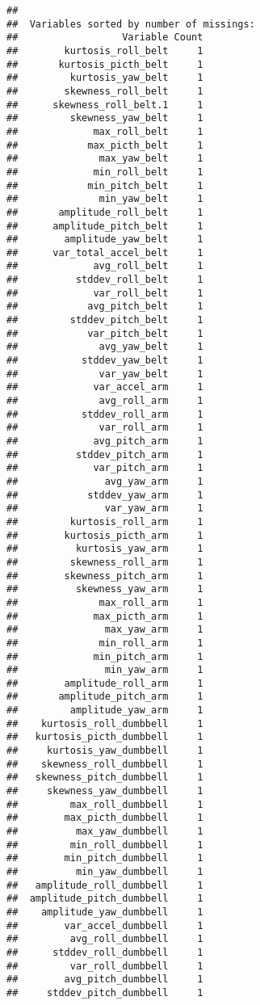 \documentclass[]{article}
\begin{document}
\begin{verbatim}
## 
##  Variables sorted by number of missings: 
##                  Variable Count
##        kurtosis_roll_belt     1
##       kurtosis_picth_belt     1
##         kurtosis_yaw_belt     1
##        skewness_roll_belt     1
##      skewness_roll_belt.1     1
##         skewness_yaw_belt     1
##             max_roll_belt     1
##            max_picth_belt     1
##              max_yaw_belt     1
##             min_roll_belt     1
##            min_pitch_belt     1
##              min_yaw_belt     1
##       amplitude_roll_belt     1
##      amplitude_pitch_belt     1
##        amplitude_yaw_belt     1
##      var_total_accel_belt     1
##             avg_roll_belt     1
##          stddev_roll_belt     1
##             var_roll_belt     1
##            avg_pitch_belt     1
##         stddev_pitch_belt     1
##            var_pitch_belt     1
##              avg_yaw_belt     1
##           stddev_yaw_belt     1
##              var_yaw_belt     1
##             var_accel_arm     1
##              avg_roll_arm     1
##           stddev_roll_arm     1
##              var_roll_arm     1
##             avg_pitch_arm     1
##          stddev_pitch_arm     1
##             var_pitch_arm     1
##               avg_yaw_arm     1
##            stddev_yaw_arm     1
##               var_yaw_arm     1
##         kurtosis_roll_arm     1
##        kurtosis_picth_arm     1
##          kurtosis_yaw_arm     1
##         skewness_roll_arm     1
##        skewness_pitch_arm     1
##          skewness_yaw_arm     1
##              max_roll_arm     1
##             max_picth_arm     1
##               max_yaw_arm     1
##              min_roll_arm     1
##             min_pitch_arm     1
##               min_yaw_arm     1
##        amplitude_roll_arm     1
##       amplitude_pitch_arm     1
##         amplitude_yaw_arm     1
##    kurtosis_roll_dumbbell     1
##   kurtosis_picth_dumbbell     1
##     kurtosis_yaw_dumbbell     1
##    skewness_roll_dumbbell     1
##   skewness_pitch_dumbbell     1
##     skewness_yaw_dumbbell     1
##         max_roll_dumbbell     1
##        max_picth_dumbbell     1
##          max_yaw_dumbbell     1
##         min_roll_dumbbell     1
##        min_pitch_dumbbell     1
##          min_yaw_dumbbell     1
##   amplitude_roll_dumbbell     1
##  amplitude_pitch_dumbbell     1
##    amplitude_yaw_dumbbell     1
##        var_accel_dumbbell     1
##         avg_roll_dumbbell     1
##      stddev_roll_dumbbell     1
##         var_roll_dumbbell     1
##        avg_pitch_dumbbell     1
##     stddev_pitch_dumbbell     1

\end{verbatim}
\end{document}
